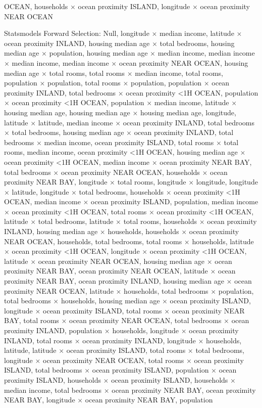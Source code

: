 \documentclass{article}
\begin{document}
OCEAN, households $\times$ ocean proximity ISLAND, longitude $\times$ ocean proximity NEAR OCEAN

Statsmodels Forward Selection: Null, longitude $\times$ median income, latitude $\times$ ocean proximity INLAND, housing median age $\times$ total bedrooms, housing median age $\times$ population, housing median age $\times$ median income, median income $\times$ median income, median income $\times$ ocean proximity NEAR OCEAN, housing median age $\times$ total rooms, total rooms $\times$ median income, total rooms, population $\times$ population, total rooms $\times$ population, population $\times$ ocean proximity INLAND, total bedrooms $\times$ ocean proximity <1H OCEAN, population $\times$ ocean proximity <1H OCEAN, population $\times$ median income, latitude $\times$ housing median age, housing median age $\times$ housing median age, longitude, latitude $\times$ latitude, median income $\times$ ocean proximity INLAND, total bedrooms $\times$ total bedrooms, housing median age $\times$ ocean proximity INLAND, total bedrooms $\times$ median income, ocean proximity ISLAND, total rooms $\times$ total rooms, median income, ocean proximity <1H OCEAN, housing median age $\times$ ocean proximity <1H OCEAN, median income $\times$ ocean proximity NEAR BAY, total bedrooms $\times$ ocean proximity NEAR OCEAN, households $\times$ ocean proximity NEAR BAY, longitude $\times$ total rooms, longitude $\times$ longitude, longitude $\times$ latitude, longitude $\times$ total bedrooms, households $\times$ ocean proximity <1H OCEAN, median income $\times$ ocean proximity ISLAND, population, median income $\times$ ocean proximity <1H OCEAN, total rooms $\times$ ocean proximity <1H OCEAN, latitude $\times$ total bedrooms, latitude $\times$ total rooms, households $\times$ ocean proximity INLAND, housing median age $\times$ households, households $\times$ ocean proximity NEAR OCEAN, households, total bedrooms, total rooms $\times$ households, latitude $\times$ ocean proximity <1H OCEAN, longitude $\times$ ocean proximity <1H OCEAN, latitude $\times$ ocean proximity NEAR OCEAN, housing median age $\times$ ocean proximity NEAR BAY, ocean proximity NEAR OCEAN, latitude $\times$ ocean proximity NEAR BAY, ocean proximity INLAND, housing median age $\times$ ocean proximity NEAR OCEAN, latitude $\times$ households, total bedrooms $\times$ population, total bedrooms $\times$ households, housing median age $\times$ ocean proximity ISLAND, longitude $\times$ ocean proximity ISLAND, total rooms $\times$ ocean proximity NEAR BAY, total rooms $\times$ ocean proximity NEAR OCEAN, total bedrooms $\times$ ocean proximity INLAND, population $\times$ households, longitude $\times$ ocean proximity INLAND, total rooms $\times$ ocean proximity INLAND, longitude $\times$ households, latitude, latitude $\times$ ocean proximity ISLAND, total rooms $\times$ total bedrooms, longitude $\times$ ocean proximity NEAR OCEAN, total rooms $\times$ ocean proximity ISLAND, total bedrooms $\times$ ocean proximity ISLAND, population $\times$ ocean proximity ISLAND, households $\times$ ocean proximity ISLAND, households $\times$ median income, total bedrooms $\times$ ocean proximity NEAR BAY, ocean proximity NEAR BAY, longitude $\times$ ocean proximity NEAR BAY, population 
\end{document}
